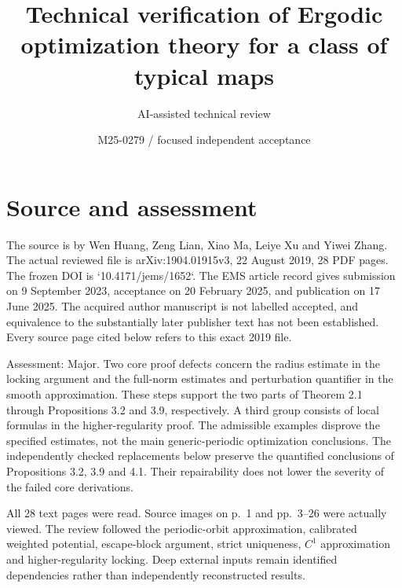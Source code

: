 \documentclass[10pt]{article}
\title{Technical verification of
Ergodic optimization theory for a class of typical maps}
\author{AI-assisted technical review}
\date{M25-0279 / focused independent acceptance}
\begin{document}
\maketitle
\section*{Source and assessment}
The source is by Wen Huang, Zeng Lian, Xiao Ma, Leiye Xu and Yiwei Zhang. The actual reviewed file is arXiv:1904.01915v3, 22 August 2019, 28 PDF pages. The frozen DOI is `10.4171/jems/1652`. The EMS article record gives submission on 9 September 2023, acceptance on 20 February 2025, and publication on 17 June 2025. The acquired author manuscript is not labelled accepted, and equivalence to the substantially later publisher text has not been established. Every source page cited below refers to this exact 2019 file.\par
Assessment: Major. Two core proof defects concern the radius estimate in the locking argument and the full-norm estimates and perturbation quantifier in the smooth approximation. These steps support the two parts of Theorem 2.1 through Propositions 3.2 and 3.9, respectively. A third group consists of local formulas in the higher-regularity proof. The admissible examples disprove the specified estimates, not the main generic-periodic optimization conclusions. The independently checked replacements below preserve the quantified conclusions of Propositions 3.2, 3.9 and 4.1. Their repairability does not lower the severity of the failed core derivations.\par
All 28 text pages were read. Source images on p. 1 and pp. 3–26 were actually viewed. The review followed the periodic-orbit approximation, calibrated weighted potential, escape-block argument, strict uniqueness, \(C^1\) approximation and higher-regularity locking. Deep external inputs remain identified dependencies rather than independently reconstructed results.\par
\end{document}
